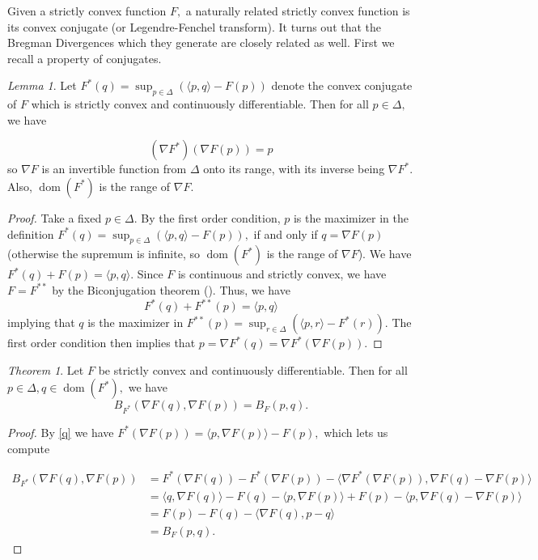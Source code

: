 \documentclass[BSc]{usydthesis}
\numberwithin{equation}{chapter}
\theoremstyle{remark}
\newtheorem{Theorem}[equation]{Theorem}
\newtheorem{Lemma}[equation]{Lemma}
\begin{document}
Given a strictly convex function $F,$ a naturally related strictly convex function is its convex conjugate (or Legendre-Fenchel transform). It turns out that the Bregman Divergences which they generate are closely related as well. First we recall a property of conjugates.

\begin{Lemma}\label{invert}
 Let $F^*(q) = \sup_{p\in \Delta} ( \langle p, q \rangle - F(p) )$ denote the convex conjugate of $F$ which is strictly convex and continuously differentiable. Then for all $p\in \Delta,$ we have
 
 $$(\nabla F^*)(\nabla F(p)) = p$$
 so $\nabla F$ is an invertible function from $\Delta$ onto its range, with its inverse being $\nabla F^*.$ Also, $\operatorname{dom}(F^*)$ is the range of $\nabla F.$
\end{Lemma} 
 \begin{proof}
  Take a fixed $p\in \Delta.$ By the first order condition, $p$ is the maximizer in the definition $F^*(q) = \sup_{p\in\Delta} ( \langle p,q\rangle - F(p)),$ if and only if $q = \nabla F(p)$ (otherwise the supremum is infinite, so $\operatorname{dom}(F^*)$ is the range of $\nabla F$). We have $F^*(q) + F(p) = \langle p,q\rangle.$ Since $F$ is continuous and strictly convex, we have $F = F^{**}$ by the Biconjugation theorem (\cite{Bi}). Thus, we have 
\begin{equation}
F^*(q) + F^{**}(p) = \langle p,q\rangle \label{q}
\end{equation}
 implying that $q$ is the maximizer in $F^{**}(p) = \sup_{r\in\Delta} ( \langle p, r \rangle - F^*(r)).$ The first order condition then implies that $p = \nabla F^*(q) = \nabla F^*( \nabla F(p)).$ 
 \end{proof}


\begin{Theorem}
 Let $F$ be strictly convex and continuously differentiable. Then for all $p\in \Delta, q\in \operatorname{dom}(F^*),$ we have
 $$ B_{F^*}(\nabla F(q), \nabla F(p)) = B_F(p,q).$$
\end{Theorem}

\begin{proof}

 By \eqref{q} we have $F^*( \nabla F(p)) = \langle p, \nabla F(p)\rangle - F(p),$ which lets us compute
 
 \begin{align*}
  B_{F^*} ( \nabla F(q), \nabla F(p)) &= F^*(\nabla F(q)) - F^*(\nabla F(p)) - \langle \nabla F^*( \nabla F(p)), \nabla F(q) - \nabla F(p)\rangle \\
  &= \langle q, \nabla F(q)\rangle - F(q) - \langle p, \nabla F(p)\rangle + F(p) - \langle p, \nabla F(q) - \nabla F(p)\rangle \\
  &= F(p) - F(q) - \langle \nabla F(q), p-q\rangle\\
  &= B_F(p,q).
 \end{align*}


\end{proof}
\end{document}
